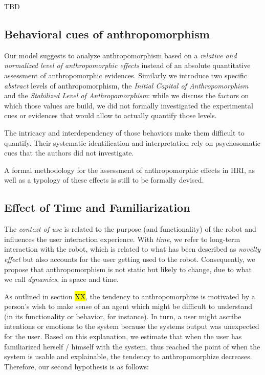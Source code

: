 \documentclass{frontiersSCNS} %
\begin{document}
TBD

\subsection{Behavioral cues of anthropomorphism}
\label{sec:behavioralcues}

Our model suggests to analyze anthropomorphism based on a \emph{relative and
normalized level of anthropomorphic effects} instead of an absolute
quantitative assessment of anthropomorphic evidences. Similarly we introduce
two specific \emph{abstract} levels of anthropomorphism, the \emph{Initial
Capital of Anthropomorphism} and the \emph{Stabilized Level of
Anthropomorphism}: while we discuss the factors on which those values are
build, we did not formally investigated the experimental cues or evidences
that would allow to actually quantify those levels.

The intricacy and interdependency of those behaviors make them difficult to
quantify.  Their systematic identification and interpretation rely on
psychosomatic cues that the authors did not investigate.

A formal methodology for the assessment of anthropomorphic effects in HRI, as
well as a typology of these effects is still to be formally devised.

\subsection{Effect of Time and Familiarization}
\label{sec:8.2}

The \textit{context of use} is related to the purpose (and functionality) of the
robot and influences the user interaction experience. With \textit{time}, we
refer to long-term interaction with the robot, which is related to what has been
described as \textit{novelty effect} but also accounts for the user getting used
to the robot. Consequently, we propose that anthropomorphism is not static but
likely to change, due to what we call \textit{dynamics}, in space and time.


As outlined in section \hl{XX}, the tendency to anthropomorphize is motivated by
a person's wish to make sense of an agent which might be difficult to understand
(in its functionality or behavior, for instance). In turn, a user might ascribe
intentions or emotions to the system because the systems output was unexpected
for the user. Based on this explanation, we estimate that when the user has
familiarized herself / himself with the system, thus reached the point of when
the system is usable and explainable, the tendency to anthropomorphize
decreases. Therefore, our second hypothesis is as follows: 
\end{document}
